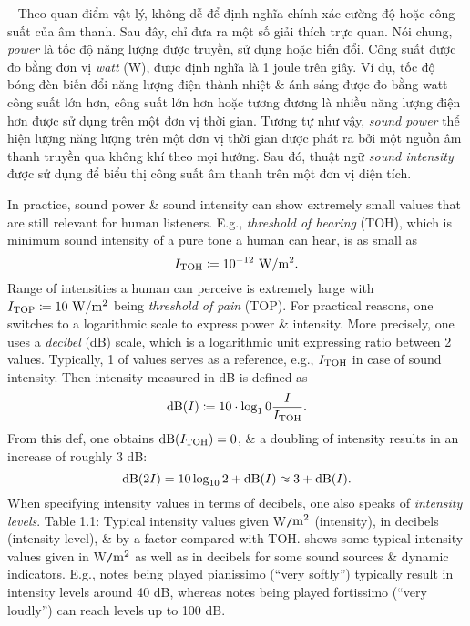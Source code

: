 \documentclass{article}
\begin{document}
\begin{itemize}
\begin{itemize}
\begin{itemize}
			-- Theo quan điểm vật lý, không dễ để định nghĩa chính xác cường độ hoặc công suất của âm thanh. Sau đây, chỉ đưa ra một số giải thích trực quan. Nói chung, {\it power} là tốc độ năng lượng được truyền, sử dụng hoặc biến đổi. Công suất được đo bằng đơn vị {\it watt} (W), được định nghĩa là 1 joule trên giây. Ví dụ, tốc độ bóng đèn biến đổi năng lượng điện thành nhiệt \& ánh sáng được đo bằng watt -- công suất lớn hơn, công suất lớn hơn hoặc tương đương là nhiều năng lượng điện hơn được sử dụng trên một đơn vị thời gian. Tương tự như vậy, {\it sound power} thể hiện lượng năng lượng trên một đơn vị thời gian được phát ra bởi một nguồn âm thanh truyền qua không khí theo mọi hướng. Sau đó, thuật ngữ {\it sound intensity} được sử dụng để biểu thị công suất âm thanh trên một đơn vị diện tích.
			
			In practice, sound power \& sound intensity can show extremely small values that are still relevant for human listeners. E.g., {\it threshold of hearing} (TOH), which is minimum sound intensity of a pure tone a human can hear, is as small as
			\begin{equation*}
				I_{\rm TOH}\coloneqq10^{-12}\ {\rm W{\tt/}m^2}.
			\end{equation*}
			Range of intensities a human can perceive is extremely large with $I_{\rm TOP}\coloneqq10\ {\rm W{\tt/}m^2}$ being {\it threshold of pain} (TOP). For practical reasons, one switches to a logarithmic scale to express power \& intensity. More precisely, one uses a {\it decibel} (dB) scale, which is a logarithmic unit expressing ratio between 2 values. Typically, 1 of values serves as a reference, e.g., $I_{\rm TOH}$ in case of sound intensity. Then intensity measured in dB is defined as
			\begin{equation*}
				{\rm dB}(I)\coloneqq10\cdot\log_10\frac{I}{I_{\rm TOH}}.
			\end{equation*}
			From this def, one obtains ${\rm dB}(I_{\rm TOH}) = 0$, \& a doubling of intensity results in an increase of roughly 3 dB:
			\begin{equation*}
				{\rm dB}(2I) = 10\log_{10}2 + {\rm dB}(I)\approx3 + {\rm dB}(I).
			\end{equation*}
			When specifying intensity values in terms of decibels, one also speaks of {\it intensity levels}. {\sf Table 1.1: Typical intensity values given W{\tt/}$\rm m^2$ (intensity), in decibels (intensity level), \& by a factor compared with TOH.} shows some typical intensity values given in W{\tt/}$\rm m^2$ as well as in decibels for some sound sources \& dynamic indicators. E.g., notes being played pianissimo (``very softly'') typically result in intensity levels around 40 dB, whereas notes being played fortissimo (``very loudly'') can reach levels up to 100 dB.
			

\end{itemize}
\end{itemize}
\end{itemize}
\end{document}
